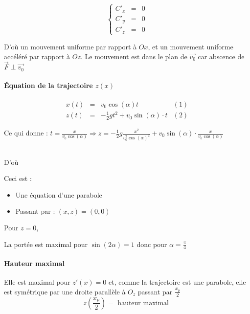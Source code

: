 		\[\left\{\begin{array}{rcl}
			C'_x &=& 0 \\
			C'_y &=& 0 \\
			C'_z &=& 0 \end{array}\right.\]

D'où un mouvement uniforme par rapport à $Ox$, et un mouvement uniforme accéléré par rapport à $Oz$.
Le mouvement est dans le plan de $\vec{v_0}$ car abscence de $\vec{F} \perp  \vec{v_0}$

\paragraph{Équation de la trajectoire $z(x)$ }

\[\begin{array}{rclr}
		x(t) &=& v_0 \cos(\alpha) t & (1) \\
z(t) &=& -\frac{1}{2}gt^2 + v_0 \sin(\alpha)\cdot t & (2)\end{array}\]
	
	Ce qui donne : $t = \frac{x}{v_0\cos(\alpha)} \Rightarrow z=-\frac{1}{2}g\frac{x^2}{v_0^2\cos(\alpha)^2} + v_0 \sin(\alpha) \cdot \frac{x}{v_0\cos(\alpha)}$ ~\\ ~\\
\begin{center} D'où \end{center}

	Ceci est : \begin{itemize}
		\item Une équation d'une parabole 
		\item Passant par : $(x,z) = (0, 0)$
	\end{itemize}
	
	\begin{center} Pour $z=0$, \end{center}

	La portée est maximal pour $\sin(2\alpha) = 1$ donc pour $\alpha = \frac{\pi}{4}$

	\paragraph{Hauteur maximal}
	Elle est maximal pour $z'(x) = 0$ et, comme la trajectoire est une parabole, elle est symétrique par une droite parallèle à $O_z$ passant par $\frac{x_p}{2}$
	\[z(\frac{x_p}{2}) = \text{ hauteur maximal }\] 

